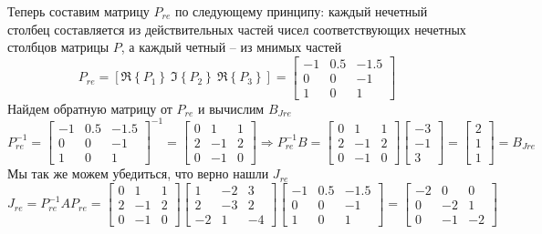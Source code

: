 \documentclass[a4paper, 12pt]{article}
\begin{document}
    Теперь составим матрицу $P_{re}$ по следующему принципу: каждый нечетный столбец составляется из действительных
    частей чисел соответствующих нечетных столбцов матрицы $P$, а каждый четный -- из мнимых частей
    $$P_{re}=\left[\Re{\left\{P_1\right\}}\ \Im{\left\{P_2\right\}}\ \Re{\left\{P_3\right\}}\right]=\begin{bmatrix}
        -1 &0.5 &-1.5\\
        0 &0 &-1\\
        1 &0 &1
    \end{bmatrix}$$
    Найдем обратную матрицу от $P_{re}$ и вычислим $B_{Jre}$
    $$
    P_{re}^{-1}=\begin{bmatrix}
        -1 &0.5 &-1.5\\
        0 &0 &-1\\
        1 &0 &1
    \end{bmatrix}^{-1}=\begin{bmatrix}
        0 &1 &1\\
        2 &-1 &2\\
        0 &-1 &0
    \end{bmatrix}\Rightarrow
    P_{re}^{-1}B=\begin{bmatrix}
        0 &1 &1\\
        2 &-1 &2\\
        0 &-1 &0
    \end{bmatrix}\begin{bmatrix}
        -3\\
        -1\\
        3
    \end{bmatrix}=\begin{bmatrix}
        2\\
        1\\
        1
    \end{bmatrix}=B_{Jre}
    $$
    Мы так же можем убедиться, что верно нашли $J_{re}$
    $$J_{re}=P_{re}^{-1}AP_{re}=\begin{bmatrix}
        0 &1 &1\\
        2 &-1 &2\\
        0 &-1 &0
    \end{bmatrix}\begin{bmatrix}
        1 &-2 &3\\
        2 &-3 &2\\
        -2 &1 &-4
    \end{bmatrix}\begin{bmatrix}
        -1 &0.5 &-1.5\\
        0 &0 &-1\\
        1 &0 &1
    \end{bmatrix}=\begin{bmatrix}
        -2 &0 &0\\
        0 &-2 &1\\
        0 &-1 &-2
    \end{bmatrix}$$
\end{document}
